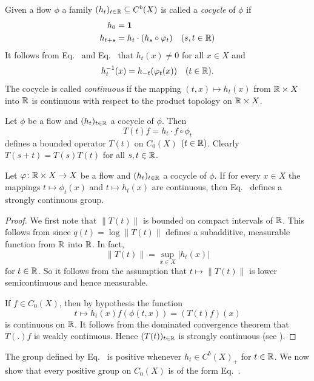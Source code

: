 Given a flow $\phi$ a family $(h_{t})_{t \in \mathbb{R}} \subseteq C^{b}(X)$ is called a \emph{cocycle} of\/ $\phi$ if
\begin{align}
h_{0} &= \1 \label{eq:b2-3.10} \\
h_{t+s} &= h_{t} \cdot (h_{s} \circ \phi_{t}) \quad (s,t \in \R) \label{eq:b2-3.11}
\end{align}
It follows from Eq.~ and Eq.~ that $h_{t}(x) \neq 0$ for all $x \in X$ and 
%
\[
	h_{t}^{-1}(x) = h_{-t}(\phi_{t}(x)) \quad (t \in \R).
\]
%
The cocycle is called \emph{continuous} if the mapping $(t,x) \mapsto h_{t}(x)$ from $\mathbb{R} \times X$ into $\mathbb{R}$ is continuous with respect to the product topology on $\mathbb{R} \times X$.

Let $\phi$ be a flow and $(h_{t})_{t \in \mathbb{R}}$ a cocycle of\/ $\phi$.
Then
\begin{equation}\label{eq:b2-3.12}
T(t)f = h_{t} \cdot f \circ \phi_{t}
\end{equation}
defines a bounded operator $T(t)$ on $C_{0}(X)$ $(t \in \mathbb{R})$.
Clearly $T(s+t) = T(s)T(t)$ for all $s,t \in \mathbb{R}$.
\begin{proposition}\label{prop:b2-3.8}
Let $\phi \colon \R \times X \to X$ be a flow and $(h_{t})_{t \in \mathbb{R}}$ a cocycle of\/ $\phi$.
If for every $x \in X$ the mappings $t \mapsto \phi_{t}(x)$ and $t \mapsto h_{t}(x)$ are continuous, then Eq.~ defines a strongly continuous group.
\end{proposition}
\begin{proof}
We first note that $\|T(t)\|$ is bounded on compact intervals of\/ $\mathbb{R}$.
This follows from \textcite[7.4.1]{hillephillips:1957} since $q(t) = \log\|T(t)\|$ defines a subadditive, measurable function from $\mathbb{R}$ into $\mathbb{R}$.
In fact, 
%
\[
	\|T(t)\| = \sup_{x \in X}|h_{t}(x)|
\]
%
for $t \in \mathbb{R}$.
So it follows from the assumption that $t \mapsto \|T(t)\|$ is lower semicontinuous and hence measurable.

If\/ $f \in C_{0}(X)$, then by hypothesis the function
%
\[
	t \mapsto h_{t}(x) f(\phi(t,x)) = (T(t) f) (x)
\]
%
is continuous on $\mathbb{R}$.
It follows from the dominated convergence theorem that $T(.)f$ is weakly continuous.
Hence $(T(t))_{t \in \mathbb{R}}$ is strongly continuous (see \eg \textcite[Proposition  1.23]{davies:1980}).
\end{proof}
The group defined by Eq.~ is positive whenever %
$ h_{t} \in  C^{b}(X)_{+}$ for $ t \in \mathbb{R}$.
We now show that every positive group on $C_0(X)$ is of the form Eq.~.
